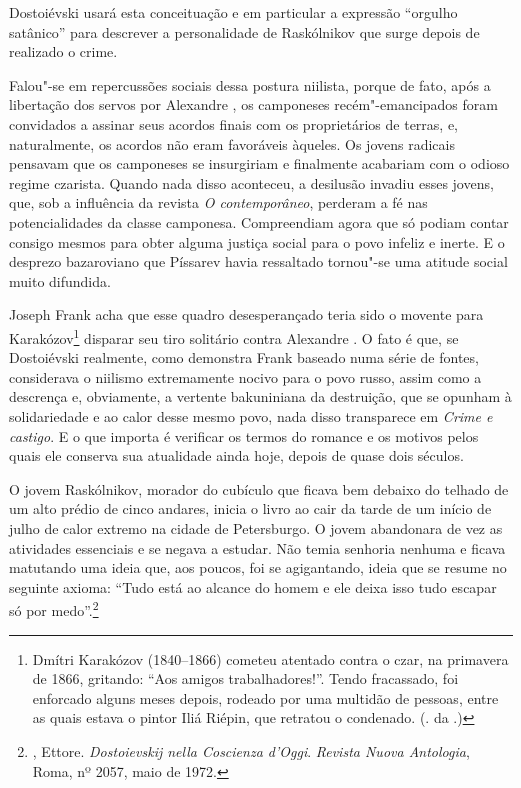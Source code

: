 Dostoiévski usará esta conceituação e em particular a expressão
``orgulho satânico'' para descrever a personalidade de Raskólnikov que
surge depois de realizado o crime.

Falou"-se em repercussões sociais dessa postura niilista, porque de fato,
após a libertação dos servos por Alexandre , os camponeses
recém"-emancipados foram convidados a assinar seus acordos finais com os
proprietários de terras, e, naturalmente, os acordos não eram favoráveis
àqueles. Os jovens radicais pensavam que os camponeses se insurgiriam e
finalmente acabariam com o odioso regime czarista. Quando nada disso
aconteceu, a desilusão invadiu esses jovens, que, sob a influência da
revista \emph{O contemporâneo}, perderam a fé nas potencialidades da
classe camponesa. Compreendiam agora que só podiam contar consigo mesmos
para obter alguma justiça social para o povo infeliz e inerte. E o
desprezo bazaroviano que Píssarev havia ressaltado tornou"-se uma atitude
social muito difundida.

Joseph Frank acha que esse quadro desesperançado teria sido o movente
para Karakózov\footnote{Dmítri Karakózov (1840--1866) cometeu atentado
  contra o czar, na primavera de 1866, gritando: ``Aos amigos
  trabalhadores!''. Tendo fracassado, foi enforcado alguns meses depois,
  rodeado por uma multidão de pessoas, entre as quais estava o pintor
  Iliá Riépin, que retratou o condenado. (. da .)} disparar seu tiro
solitário contra Alexandre . O fato é que, se Dostoiévski realmente,
como demonstra Frank baseado numa série de fontes, considerava o
niilismo extremamente nocivo para o povo russo, assim como a descrença
e, obviamente, a vertente bakuniniana da destruição, que se opunham à
solidariedade e ao calor desse mesmo povo, nada disso transparece em
\emph{Crime e castigo}. E o que importa é verificar os termos do romance
e os motivos pelos quais ele conserva sua atualidade ainda hoje, depois
de quase dois séculos.

O jovem Raskólnikov, morador do cubículo que ficava bem debaixo do
telhado de um alto prédio de cinco andares, inicia o livro ao cair da
tarde de um início de julho de calor extremo na cidade de Petersburgo. O
jovem abandonara de vez as atividades essenciais e se negava a estudar.
Não temia senhoria nenhuma e ficava matutando uma ideia que, aos poucos,
foi se agigantando, ideia que se resume no seguinte axioma: ``Tudo está
ao alcance do homem e ele deixa isso tudo escapar só por
medo''.\footnote{, Ettore. \emph{Dostoievskij nella Coscienza
  d'Oggi}. \emph{Revista Nuova Antologia}, Roma, nº 2057, maio de 1972.}

